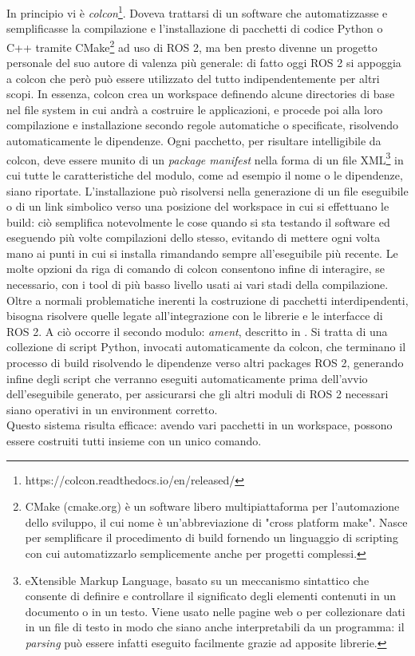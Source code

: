 In principio vi è \emph{colcon}\footnote{https://colcon.readthedocs.io/en/released/}. Doveva trattarsi di un software che automatizzasse e semplificasse la compilazione e l'installazione di pacchetti di codice Python o C++ tramite CMake\footnote{CMake (cmake.org) è un software libero multipiattaforma per l'automazione dello sviluppo, il cui nome è un'abbreviazione di "cross platform make". Nasce per semplificare il procedimento di build fornendo un linguaggio di scripting con cui automatizzarlo semplicemente anche per progetti complessi.} ad uso di ROS 2, ma ben presto divenne un progetto personale del suo autore di valenza più generale: di fatto oggi ROS 2 si appoggia a colcon che però può essere utilizzato del tutto indipendentemente per altri scopi. In essenza, colcon crea un workspace definendo alcune directories di base nel file system in cui andrà a costruire le applicazioni, e procede poi alla loro compilazione e installazione secondo regole automatiche o specificate, risolvendo automaticamente le dipendenze. Ogni pacchetto, per risultare intelligibile da colcon, deve essere munito di un \emph{package manifest} nella forma di un file XML\footnote{eXtensible Markup Language, basato su un meccanismo sintattico che consente di definire e controllare il significato degli elementi contenuti in un documento o in un testo. Viene usato nelle pagine web o per collezionare dati in un file di testo in modo che siano anche interpretabili da un programma: il \emph{parsing} può essere infatti eseguito facilmente grazie ad apposite librerie.} in cui tutte le caratteristiche del modulo, come ad esempio il nome o le dipendenze, siano riportate. L'installazione può risolversi nella generazione di un file eseguibile o di un link simbolico verso una posizione del workspace in cui si effettuano le build: ciò semplifica notevolmente le cose quando si sta testando il software ed eseguendo più volte compilazioni dello stesso, evitando di mettere ogni volta mano ai punti in cui si installa rimandando sempre all'eseguibile più recente. Le molte opzioni da riga di comando di colcon consentono infine di interagire, se necessario, con i tool di più basso livello usati ai vari stadi della compilazione.\\
Oltre a normali problematiche inerenti la costruzione di pacchetti interdipendenti, bisogna risolvere quelle legate all'integrazione con le librerie e le interfacce di ROS 2. A ciò occorre il secondo modulo: \emph{ament}, descritto in \cite{ros2_ament}. Si tratta di una collezione di script Python, invocati automaticamente da colcon, che terminano il processo di build risolvendo le dipendenze verso altri packages ROS 2, generando infine degli script che verranno eseguiti automaticamente prima dell'avvio dell'eseguibile generato, per assicurarsi che gli altri moduli di ROS 2 necessari siano operativi in un environment corretto.\\
Questo sistema risulta efficace: avendo vari pacchetti in un workspace, possono essere costruiti tutti insieme con un unico comando.

